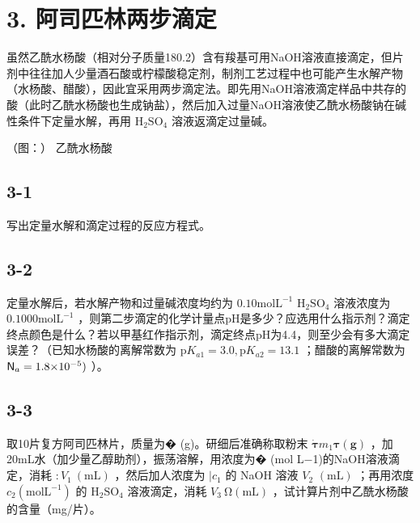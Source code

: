 \section*{3. 阿司匹林两步滴定}
虽然⼄酰⽔杨酸（相对分⼦质量180.2）含有羧基可⽤NaOH溶液直接滴定，但⽚剂中往往加⼈少量酒⽯酸或柠檬酸稳定剂，制剂⼯艺过程中也可能产⽣⽔解产物（⽔杨酸、醋酸），因此宜采⽤两步滴定法。即先⽤NaOH溶液滴定样品中共存的酸（此时⼄酰⽔杨酸也⽣成钠盐），然后加⼊过量NaOH溶液使⼄酰⽔杨酸钠在碱性条件下定量⽔解，再⽤ $\mathrm { H _ { 2 } S O _ { 4 } }$ 溶液返滴定过量碱。

（图：）
⼄酰⽔杨酸

\subsection*{3-1}
写出定量⽔解和滴定过程的反应⽅程式。

\subsection*{3-2}
定量⽔解后，若⽔解产物和过量碱浓度均约为 $0 . 1 0 \mathrm { m o l } \mathrm { L } ^ { - 1 }$ $\mathrm { H _ { 2 } S O _ { 4 } }$ 溶液浓度为 $0 . 1 0 0 0 \mathrm { m o l } \mathrm { L } ^ { - 1 }$ ，则第⼆步滴定的化学计量点pH是多少？应选⽤什么指⽰剂？滴定终点颜⾊是什么？若以甲基红作指⽰剂，滴定终点pH为4.4，则⾄少会有多⼤滴定误差？（已知⽔杨酸的离解常数为 $\mathrm { p } K _ { a 1 } = 3 . 0 , \mathrm { p } K _ { a 2 } = 1 3 . 1$ ；醋酸的离解常数为 ${ \sf N } _ { a } = 1 . 8 { \sf \times } 1 0 ^ { - 5 } )$ ）。

\subsection*{3-3}
取10⽚复⽅阿司匹林⽚，质量为� (g)。研细后准确称取粉末 $\mathbf { \dot { \tau } } m _ { 1 } \mathbf { \tau } ( \mathbf { g } )$ ，加20mL⽔（加少量⼄醇助剂），振荡溶解，⽤浓度为� (mol L−1)的NaOH溶液滴定，消耗 $: V _ { 1 } ~ ( \mathrm { m L } )$ ，然后加⼈浓度为 $\lvert c _ { 1 }$ 的 NaOH 溶液 $V _ { 2 }$ $( \mathrm { m L } )$ ；再⽤浓度 $c _ { 2 } ( \mathrm { m o l } \mathrm { L } ^ { - 1 } )$ 的 $\mathrm { H _ { 2 } S O _ { 4 } }$ 溶液滴定，消耗 $V _ { 3 } ~ \mathrm { \Omega } ( \mathrm { m L } )$ ，试计算⽚剂中⼄酰⽔杨酸的含量（mg/⽚）。
